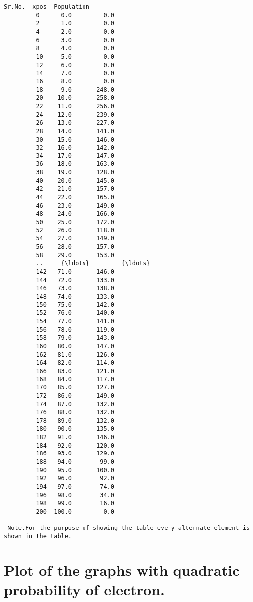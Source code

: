 \documentclass[11pt]{article}
\begin{document}
\begin{Verbatim}[commandchars=\\\{\}]
        Sr.No.  xpos  Population
         0      0.0         0.0
         2      1.0         0.0
         4      2.0         0.0
         6      3.0         0.0
         8      4.0         0.0
         10     5.0         0.0
         12     6.0         0.0
         14     7.0         0.0
         16     8.0         0.0
         18     9.0       248.0
         20    10.0       258.0
         22    11.0       256.0
         24    12.0       239.0
         26    13.0       227.0
         28    14.0       141.0
         30    15.0       146.0
         32    16.0       142.0
         34    17.0       147.0
         36    18.0       163.0
         38    19.0       128.0
         40    20.0       145.0
         42    21.0       157.0
         44    22.0       165.0
         46    23.0       149.0
         48    24.0       166.0
         50    25.0       172.0
         52    26.0       118.0
         54    27.0       149.0
         56    28.0       157.0
         58    29.0       153.0
         ..     {\ldots}         {\ldots}
         142   71.0       146.0
         144   72.0       133.0
         146   73.0       138.0
         148   74.0       133.0
         150   75.0       142.0
         152   76.0       140.0
         154   77.0       141.0
         156   78.0       119.0
         158   79.0       143.0
         160   80.0       147.0
         162   81.0       126.0
         164   82.0       114.0
         166   83.0       121.0
         168   84.0       117.0
         170   85.0       127.0
         172   86.0       149.0
         174   87.0       132.0
         176   88.0       132.0
         178   89.0       132.0
         180   90.0       135.0
         182   91.0       146.0
         184   92.0       120.0
         186   93.0       129.0
         188   94.0        99.0
         190   95.0       100.0
         192   96.0        92.0
         194   97.0        74.0
         196   98.0        34.0
         198   99.0        16.0
         200  100.0         0.0
        
 Note:For the purpose of showing the table every alternate element is shown in the table.
\end{Verbatim}
            

            
    \hypertarget{plot-of-the-graphs-with-quadratic-probability-of-electron.}{%
\section{Plot of the graphs with quadratic probability of
electron.}\label{plot-of-the-graphs-with-quadratic-probability-of-electron.}}
\end{document}
